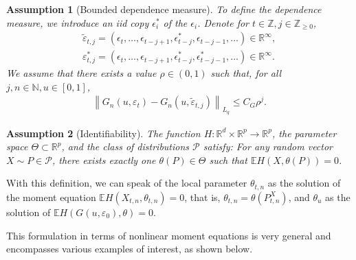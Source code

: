 \documentclass[10pt, a4paper]{article}
\theoremstyle{assumption}
\newtheorem{assumption}{Assumption}[section]
\theoremstyle{definition}
\theoremstyle{theorem}
\newcommand{\R}{\mathbb{R}}
\newcommand{\E}{\mathbb{E}}
\begin{document}
\begin{assumption}[Bounded dependence measure]\label{ass:3}
    To define the dependence measure, we introduce an iid copy $\epsilon_i^*$ of the $\epsilon_i$. Denote for $t \in \mathbb{Z}, j \in \mathbb{Z}_{\ge 0}$,
    \begin{align*}
        \tilde{\varepsilon}_{t,j} = (\epsilon_t, \dots, \epsilon_{t-j+1}, \epsilon_{t-j}^*, \epsilon_{t-j-1}, \dots) \in \mathbb{R}^\infty, \\
        \varepsilon^*_{t,j} = (\epsilon_t, \dots, \epsilon_{t-j+1}, \epsilon_{t-j}^*, \epsilon_{t-j-1}^*, \dots) \in \mathbb{R}^\infty.
    \end{align*}
    We assume that there exists a value $\rho \in (0, 1)$ such that, for all $j, n \in \mathbb{N}, u \in [0, 1]$,
    \begin{align}
        \left\| G_n(u, \varepsilon_t) - G_n(u, \tilde{\varepsilon}_{t,j}) \right\|_{L_q} \le C_G \rho^j.  
    \end{align}
\end{assumption}

\begin{assumption}[Identifiability]\label{ass:identifiable}
    The function $H:\R^d\times \R^p\to \R^p$, the parameter space $\Theta\subset\R^p$, and the class of distributions $\mathcal{P}$ satisfy:  
    For any random vector $X\sim P\in\mathcal{P}$, there exists exactly one $\theta(P)\in\Theta$ such that $\E H(X,\theta(P))=0$.
\end{assumption}

With this definition, we can speak of the local parameter $\theta_{t,n}$ as the solution of the moment equation $\E H(X_{t,n},\theta_{t,n})=0$, that is, $\theta_{t,n}=\theta(P^X_{t,n})$, and $\theta_u$ as the solution of $\E H(G(u, \varepsilon_0),\theta)=0$.


This formulation in terms of nonlinear moment equations is very general and encompasses various examples of interest, as shown below.
\end{document}
